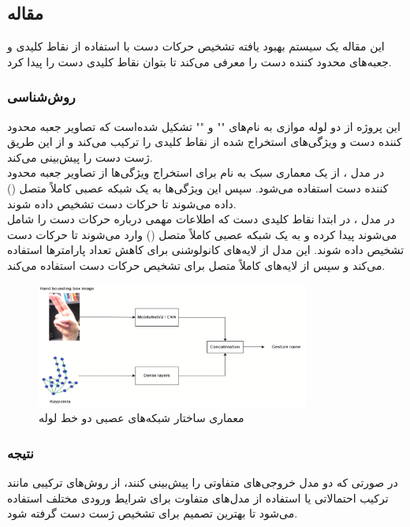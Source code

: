 \cite{murugeswari2014hand}


\subsection{مقاله }
این مقاله یک سیستم بهبود یافته تشخیص حرکات دست با استفاده از نقاط کلیدی و جعبه‌های محدود کننده دست را معرفی می‌کند تا بتوان نقاط کلیدی دست را پیدا کرد.


\subsubsection{روش‌شناسی}
این پروژه از دو لوله موازی به نام‌های "" و "" تشکیل شده‌است که تصاویر جعبه 
محدود کننده دست و ویژگی‌های استخراج شده از نقاط کلیدی را ترکیب می‌کند و از این طریق ژست دست را پیش‌بینی می‌کند. 
\\
در مدل ، از یک معماری سبک به نام  برای استخراج ویژگی‌ها از تصاویر جعبه 
محدود کننده دست استفاده می‌شود. سپس این ویژگی‌ها به یک شبکه عصبی کاملاً متصل () داده می‌شوند تا حرکات دست تشخیص داده شوند.
\\
در مدل  ، در ابتدا نقاط کلیدی دست  که اطلاعات مهمی درباره حرکات دست را شامل می‌شوند پیدا کرده و به یک شبکه عصبی کاملاً متصل () وارد می‌شوند تا حرکات دست
تشخیص داده شوند. این مدل از لایه‌های کانولوشنی برای کاهش تعداد پارامترها استفاده می‌کند و سپس از لایه‌های کاملاً متصل برای تشخیص حرکات دست استفاده می‌کند.

\begin{figure}[h]
    \centering
    \includegraphics[width=0.8\textwidth]{keypoints_boundingBox.png}
    \caption{معماری ساختار شبکه‌های عصبی دو خط لوله}
\end{figure}


\subsubsection{نتیجه}
در صورتی که دو مدل خروجی‌های متفاوتی را پیش‌بینی کنند، از روش‌های ترکیبی مانند ترکیب احتمالاتی یا استفاده از مدل‌های متفاوت برای شرایط ورودی مختلف استفاده می‌شود تا بهترین تصمیم برای تشخیص ژست دست گرفته شود.




